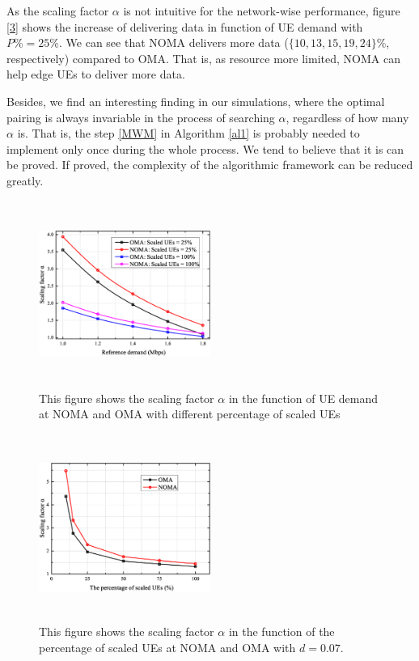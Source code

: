 \documentclass[10pt,journal,final,finalsubmission,twocolumn]{IEEEtran}
\begin{document}
As the scaling factor $\alpha$ is not intuitive for the network-wise performance, figure \ref{3} shows the increase of delivering data in function of UE demand with $P\% = 25\%$. We can see that NOMA delivers more data ($\{10, 13, 15, 19, 24\}\%$, respectively) compared to OMA. That is, as resource more limited, NOMA can help edge UEs to deliver more data.

Besides, we find an interesting finding in our simulations, where the optimal pairing is always invariable in the process of searching $\alpha$, regardless of how many $\alpha$ is. That is, the step \ref{MWM} in Algorithm \ref{al1} is probably needed to implement only once during the whole process. We tend to believe that it is can be proved. If proved, the complexity of the algorithmic framework can be reduced greatly. 

\begin{figure}
\centering
\includegraphics[width=0.5\textwidth, height=6.1cm]{1.eps}
\caption{This figure shows the scaling factor $\alpha$ in the function of UE demand at NOMA and OMA with different percentage of scaled UEs}
\label{1}
\end{figure}

\begin{figure}
\centering
\includegraphics[width=0.5\textwidth, height=6.1cm]{2.eps}
\caption{This figure shows the scaling factor $\alpha$ in the function of the percentage of scaled UEs at NOMA and OMA with $d=0.07$.}
\label{2}
\end{figure}
\end{document}

